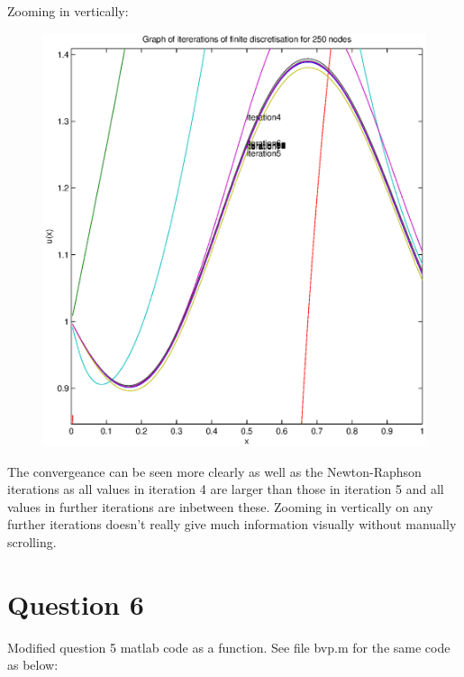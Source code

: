 \documentclass[fleqn]{report}
\begin{document}
Zooming in vertically: 
\begin{figure}[h!]
\begin{center}
    \centerline{\includegraphics[width=1.1\textwidth]{graphs/q5g2.eps}}
\end{center}
\end{figure}

The convergeance can be seen more clearly as well
as the Newton-Raphson iterations as all values in iteration 4 are larger
than those in iteration 5 and all values in further iterations are inbetween these. 
Zooming in vertically on any further iterations doesn't really give
much information visually without manually scrolling.

\newpage
\section{Question 6}

Modified question 5 matlab code as a function. See file bvp.m for
the same code as below:

\end{document}

